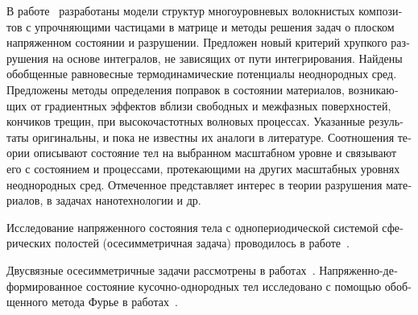 \begin{russian}
В работе~\cite{Garishin} разработаны модели структур многоуровневых волокнистых композитов с упрочняющими частицами в матрице и методы решения задач о плоском напряженном состоянии и разрушении. Предложен новый критерий хрупкого разрушения на основе интегралов, не зависящих от пути интегрирования. Найдены обобщенные равновесные термодинамические потенциалы неоднородных сред. Предложены методы определения поправок в состоянии материалов, возникающих от градиентных эффектов вблизи свободных и межфазных поверхностей, кончиков трещин, при высокочастотных волновых процессах. Указанные результаты оригинальны, и пока не известны их аналоги в литературе. Соотношения теории описывают состояние тел на выбранном масштабном уровне и связывают его с состоянием и процессами, протекающими на других масштабных уровнях неоднородных сред. Отмеченное представляет интерес в теории разрушения материалов, в задачах нанотехнологии и др.

Исследование напряженного состояния тела с однопериодической системой сферических полостей (осесимметричная задача) проводилось в работе~\cite{Olegin}.

Двусвязные осесимметричные задачи рассмотрены в работах~\cite{Smirnov, Atsumi, Mura, Tsuchida1980, Tsuchida1979}. Напряженно-деформированное состояние кусочно-однородных тел исследовано с помощью обобщенного метода Фурье в работах~\cite{Nikolaev2003, Nikolaev2004, Nikolaev2011, Nikolaev2007, Nikolaev2010, Nikolaev2009, Nikolaev2013, Nikolaev2012, Nikolaev-Tanchik2012, Nikolaev2013-1, Nikolaev2013-2, Nikolaev2013-19, Nikolaev2013-4, Nikolaev2014-1, Nikolaev2014-9, Nikolaev2013-3, Nikolaev2014-2, Nikolaev2014-3, Nikolaev2014-4, Nikolaev2014-5, Nikolaev2014-6, Nikolaev2014-7, Nikolaev2015-1}.


\end{russian}
